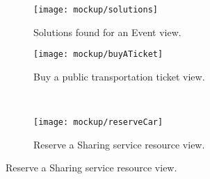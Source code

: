 \begin{figure}[H]
	\caption{Samples of the Travel logic module.}
	
	\begin{subfigure}{0.5\textwidth}
		\texttt{[image: mockup/solutions]} 
		\centering
		\caption{Solutions found for an Event view.}
		\label{fig:solutions}
	\end{subfigure}
	\begin{subfigure}{0.5\textwidth}
		\texttt{[image: mockup/buyATicket]} 
		\centering
		\caption{Buy a public transportation ticket view.}
		\label{fig:buyTicket}
	\end{subfigure} \\
	\begin{subfigure}{\linewidth}
		\texttt{[image: mockup/reserveCar]} 
		\centering
		\caption{Reserve a Sharing service resource view.}
		\label{fig:reserveCar}
	\end{subfigure}

	\label{fig:travelLogic}
\end{figure}